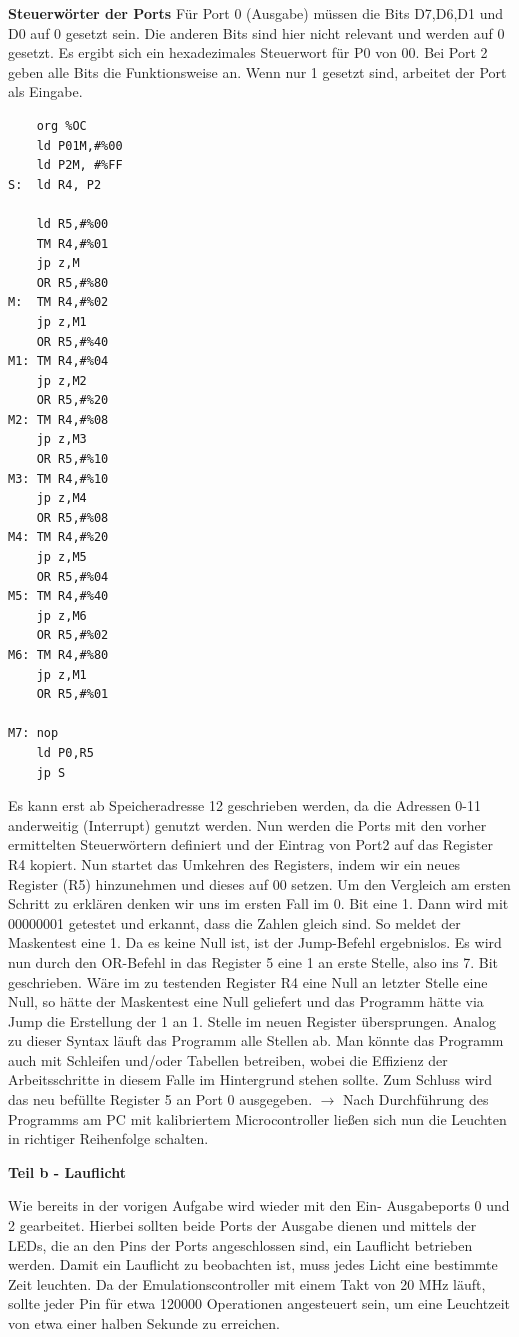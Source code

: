 \textbf{Steuerwörter der Ports}
Für Port 0 (Ausgabe) müssen die Bits D7,D6,D1 und D0 auf 0 gesetzt sein. Die anderen Bits sind hier nicht relevant und werden auf 0 gesetzt. Es ergibt sich ein hexadezimales Steuerwort für P0 von 00.
Bei Port 2 geben alle Bits die Funktionsweise an. Wenn nur 1 gesetzt sind, arbeitet der Port als Eingabe.
\begin{verbatim}
	org %OC
	ld P01M,#%00
	ld P2M, #%FF
S:  ld R4, P2

	ld R5,#%00
	TM R4,#%01
	jp z,M
	OR R5,#%80
M:  TM R4,#%02
	jp z,M1
	OR R5,#%40
M1: TM R4,#%04
	jp z,M2
	OR R5,#%20
M2: TM R4,#%08
	jp z,M3
	OR R5,#%10
M3: TM R4,#%10
	jp z,M4
	OR R5,#%08
M4: TM R4,#%20
	jp z,M5
	OR R5,#%04
M5: TM R4,#%40
	jp z,M6
	OR R5,#%02
M6: TM R4,#%80
	jp z,M1
	OR R5,#%01
	
M7: nop				
	ld P0,R5
	jp S	
\end{verbatim}
Es kann erst ab Speicheradresse 12 geschrieben werden, da die Adressen 0-11 anderweitig (Interrupt) genutzt werden. Nun werden die Ports mit den vorher ermittelten Steuerwörtern definiert und der Eintrag von Port2 auf das Register R4 kopiert.
Nun startet das Umkehren des Registers, indem wir ein neues Register (R5) hinzunehmen und dieses auf 00 setzen. Um den Vergleich am ersten Schritt zu erklären denken wir uns im ersten Fall im 0. Bit eine 1. Dann wird mit 00000001 getestet und erkannt, dass die Zahlen gleich sind. So meldet der Maskentest eine 1. Da es keine Null ist, ist der Jump-Befehl ergebnislos. Es wird nun durch den OR-Befehl in das Register 5 eine 1 an erste Stelle, also ins 7. Bit geschrieben. Wäre im zu testenden Register R4 eine Null an letzter Stelle eine Null, so hätte der Maskentest eine Null geliefert und das Programm hätte via Jump die Erstellung der 1 an 1. Stelle im neuen Register übersprungen.
Analog zu dieser Syntax läuft das Programm alle Stellen ab.
Man könnte das Programm auch mit Schleifen und/oder Tabellen betreiben, wobei die Effizienz der Arbeitsschritte in diesem Falle im Hintergrund stehen sollte. Zum Schluss wird das neu befüllte Register 5 an Port 0 ausgegeben.
$\rightarrow$ Nach Durchführung des Programms am PC mit kalibriertem Microcontroller ließen sich nun die Leuchten in richtiger Reihenfolge schalten.

\newpage
\textbf{Teil b - Lauflicht}

Wie bereits in der vorigen Aufgabe wird wieder mit den Ein- Ausgabeports 0 und 2 gearbeitet. Hierbei sollten beide Ports der Ausgabe dienen und mittels der LEDs, die an den Pins der Ports angeschlossen sind, ein Lauflicht betrieben werden. Damit ein Lauflicht zu beobachten ist, muss jedes Licht eine bestimmte Zeit leuchten. Da der Emulationscontroller mit einem Takt von 20 MHz läuft, sollte jeder Pin für etwa 120000 Operationen angesteuert sein, um eine Leuchtzeit von etwa einer halben Sekunde zu erreichen.\\


